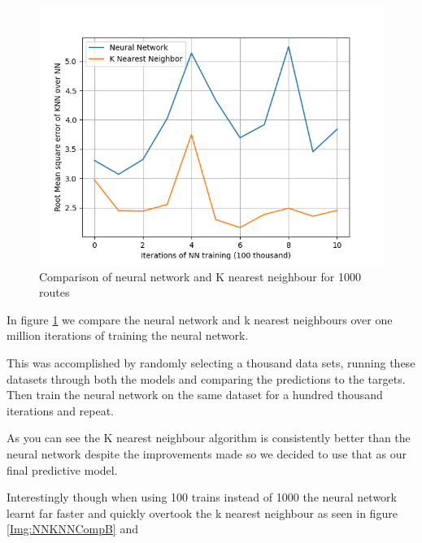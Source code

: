 \documentclass[11pt]{article}
\begin{document}
	\begin{figure}[!htb]
		\begin{center}
			\includegraphics{Resources/PartTwo/Comparison_20220128_124029.png}
		\caption{Comparison of neural network and K nearest neighbour for 1000 routes}
			\label{Img:NNKNNComp}
		\end{center}
	\end{figure}
	
	In figure \ref{Img:NNKNNComp} we compare the neural network and k nearest neighbours over one million iterations of training the neural network.
	
	This was accomplished by randomly selecting a thousand data sets, running these datasets through both the models and comparing the predictions to the targets. Then train the neural network on the same dataset for a hundred thousand iterations and repeat.
	
	As you can see the K nearest neighbour algorithm is consistently better than the neural network despite the improvements made so we decided to use that as our final predictive model.
	
	Interestingly though when using 100 trains instead of 1000 the neural network learnt far faster and quickly overtook the k nearest neighbour as seen in figure \ref{Img:NNKNNCompB} and 
	
\end{document}
